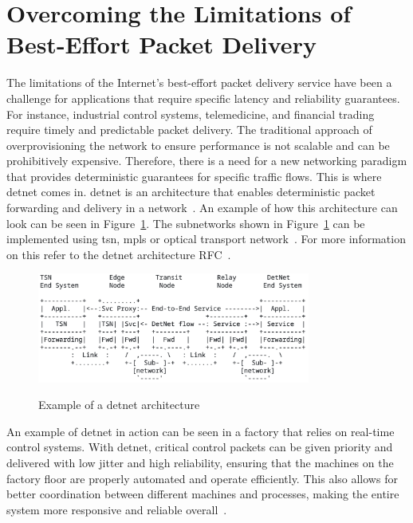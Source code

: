 \documentclass[runningheads]{llncs}
\begin{document}
\section{Overcoming the Limitations of Best-Effort Packet Delivery}

The limitations of the Internet's best-effort packet delivery service have been a challenge for applications that require specific latency and reliability guarantees. For instance, industrial control systems, telemedicine, and financial trading require timely and predictable packet delivery. The traditional approach of overprovisioning the network to ensure performance is not scalable and can be prohibitively expensive. Therefore, there is a need for a new networking paradigm that provides deterministic guarantees for specific traffic flows. This is where \gls{detnet} comes in. \gls{detnet} is an architecture that enables deterministic packet forwarding and delivery in a network~\cite{Finn2018}. An example of how this architecture can look can be seen in Figure~\ref{fig:detnet-architecture}. The subnetworks shown in Figure~\ref{fig:detnet-architecture} can be implemented using \gls{tsn}, \gls{mpls} or optical transport network~\cite{rfc8655}. For more information on this refer to the \gls{detnet} architecture RFC~\cite{rfc8655}.

\begin{figure}[ht]
  \centering
  \includegraphics[width=0.8\textwidth]{detnet_simple_arch}
  \caption{Example of a \gls{detnet} architecture}{\cite{rfc8655}}
  \label{fig:detnet-architecture}
\end{figure}

An example of \gls{detnet} in action can be seen in a factory that relies on real-time control systems. With \gls{detnet}, critical control packets can be given priority and delivered with low jitter and high reliability, ensuring that the machines on the factory floor are properly automated and operate efficiently. This also allows for better coordination between different machines and processes, making the entire system more responsive and reliable overall~\cite{rfc8578}.
\end{document}
